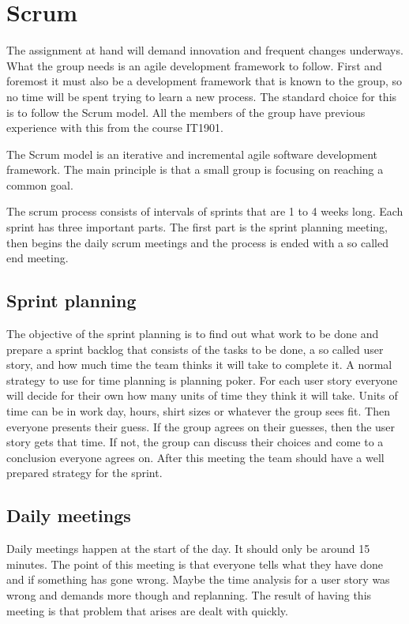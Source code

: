 \section{Scrum}


The assignment at hand will demand innovation and frequent changes underways.
What the group needs is an agile development framework to follow. First and foremost it must also be a development framework that is known to the group, 
so no time will be spent trying to learn a new process.
The standard choice for this is to follow the Scrum model. All the members of the group have previous experience with this from the course IT1901.

The Scrum model is an iterative and incremental agile software development framework.
The main principle is that a small group is focusing on reaching a common goal.

The scrum process consists of intervals of sprints that are 1 to 4 weeks long. Each sprint has three important parts.
The first part is the sprint planning meeting, then begins the daily scrum meetings and the process is ended with a so called end meeting.

\subsection{Sprint planning}
The objective of the sprint planning is to find out what work to be done and prepare a
sprint backlog that consists of the tasks to be done, a so called user story, and how much time the team thinks it will take to complete it. A normal strategy to use for time planning is
planning poker. For each user story everyone will decide for their own how many units of time they think it will take. Units of time can be in work day, hours, shirt sizes or whatever the group sees fit. 
Then everyone presents their guess. If the group agrees on their guesses, then the user story gets that time. If not, the group can discuss their choices and come to a conclusion everyone agrees on.
After this meeting the team should have a well prepared strategy for the sprint.

\subsection{Daily meetings}
Daily meetings happen at the start of the day. It should only be around 15 minutes. The point of this meeting is that everyone tells what they have done and if something has gone wrong.
Maybe the time analysis for a user story was wrong and demands more though and replanning. The result of having this meeting is that problem that arises are dealt with quickly.

